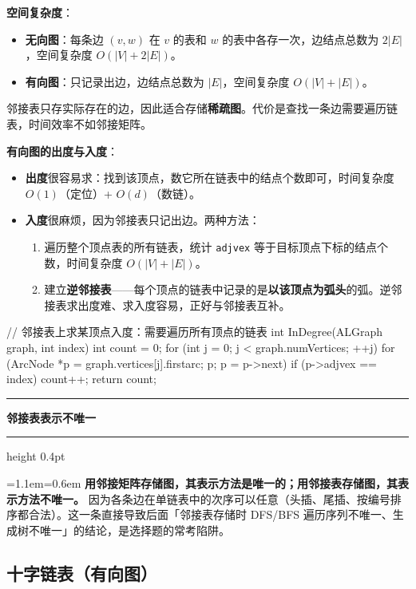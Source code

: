 \documentclass[11pt,openany,UTF8]{ctexbook}
\newcommand{\callouthead}[2]{%
  \par\addvspace{7pt}\noindent
  {\color{#1}\rule[-0.15em]{3pt}{1.05em}}\hspace{0.5em}%
  {\bfseries\color{#1}#2}\par\nobreak\vspace{-0.35em}%
  {\color{rulesep}\hrule height 0.4pt}\nobreak\vspace{0.45em}%
  \begingroup\small\setlength{\parindent}{0pt}%
  \leftskip=1.1em\rightskip=0.6em\noindent\ignorespaces}
\newcommand{\calloutend}{\par\endgroup\addvspace{7pt}}
\newenvironment{callwarn}[1]{\callouthead{warnbar}{#1}}{\calloutend}
\begin{document}
\textbf{空间复杂度}：

\begin{itemize}
\item \textbf{无向图}：每条边 $(v,w)$ 在 $v$ 的表和 $w$ 的表中各存一次，边结点总数为 $2|E|$，空间复杂度 $O(|V|+2|E|)$。
\item \textbf{有向图}：只记录出边，边结点总数为 $|E|$，空间复杂度 $O(|V|+|E|)$。
\end{itemize}
邻接表只存实际存在的边，因此适合存储\textbf{稀疏图}。代价是查找一条边需要遍历链表，时间效率不如邻接矩阵。

\textbf{有向图的出度与入度}：

\begin{itemize}
\item \textbf{出度}很容易求：找到该顶点，数它所在链表中的结点个数即可，时间复杂度 $O(1)$（定位）+ $O(d)$（数链）。
\item \textbf{入度}很麻烦，因为邻接表只记出边。两种方法：
\begin{enumerate}
\item 遍历整个顶点表的所有链表，统计 \texttt{adjvex} 等于目标顶点下标的结点个数，时间复杂度 $O(|V|+|E|)$。
\item 建立\textbf{逆邻接表}——每个顶点的链表中记录的是\textbf{以该顶点为弧头}的弧。逆邻接表求出度难、求入度容易，正好与邻接表互补。
\end{enumerate}
\end{itemize}
\begin{codebox}
// 邻接表上求某顶点入度：需要遍历所有顶点的链表
int InDegree(ALGraph graph, int index) {
    int count = 0;
    for (int j = 0; j < graph.numVertices; ++j) {
        for (ArcNode *p = graph.vertices[j].firstarc; p; p = p->next) {
            if (p->adjvex == index) count++;
        }
    }
    return count;
}
\end{codebox}

\begin{callwarn}{邻接表表示不唯一}
\textbf{用邻接矩阵存储图，其表示方法是唯一的；用邻接表存储图，其表示方法不唯一。} 因为各条边在单链表中的次序可以任意（头插、尾插、按编号排序都合法）。这一条直接导致后面「邻接表存储时 DFS/BFS 遍历序列不唯一、生成树不唯一」的结论，是选择题的常考陷阱。

\end{callwarn}

\subsection{十字链表（有向图）}
\end{document}
